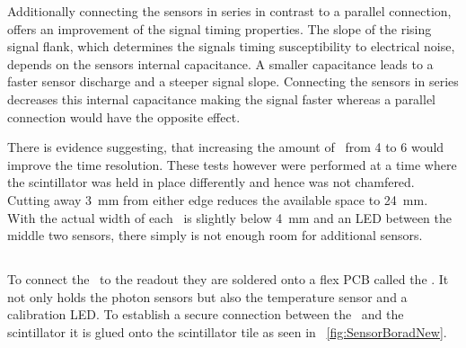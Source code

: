 \documentclass[../BTOF_summary.tex]{subfiles}
\begin{document}
Additionally connecting the sensors in series in contrast to a parallel connection, offers an improvement of the signal timing properties.
The slope of the rising signal flank, which determines the signals timing susceptibility to electrical noise, depends on the sensors internal capacitance.
A smaller capacitance leads to a faster sensor discharge and a steeper signal slope.
Connecting the sensors in series decreases this internal capacitance making the signal faster whereas a parallel connection would have the opposite effect.

There is evidence suggesting, that increasing the amount of \sipms\ from 4 to 6 would improve the time resolution.
These tests however were performed at a time where the scintillator was held in place differently and hence was not chamfered.
Cutting away \SI{3}{mm} from either edge reduces the available space to \SI{24}{mm}.
With the actual width of each \sipm\ is slightly below \SI{4}{mm} and an LED between the middle two sensors, there simply is not enough room for additional sensors.

\subsection{\sensorboard}

To connect the \sipms\ to the readout they are soldered onto a flex PCB called the \sensorboard .
It not only holds the photon sensors but also the temperature sensor and a calibration LED.
To establish a secure connection between the \sipms\ and the scintillator it is glued onto the scintillator tile as seen in \fig~\ref{fig:SensorBoradNew}.
\end{document}
